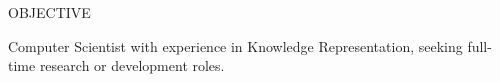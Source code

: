 %

\begin{rSection}{OBJECTIVE}

Computer Scientist with experience in Knowledge Representation, seeking full-time research or development roles.

\end{rSection}
